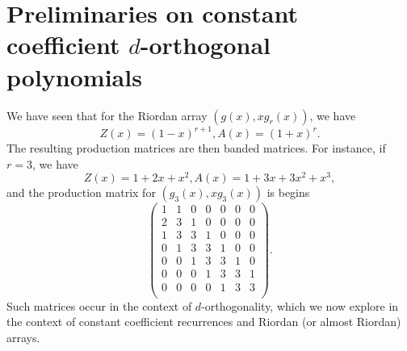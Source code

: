 \documentclass[12pt,reqno]{article}
\theoremstyle{definition}
\begin{document}
\section{Preliminaries on constant coefficient $d$-orthogonal polynomials}
We have seen that for the Riordan array $(g(x), xg_r(x))$, we have
$$Z(x)=(1-x)^{r+1}, A(x)=(1+x)^r.$$ The resulting production matrices are then banded matrices. For instance, if $r=3$, we have
$$Z(x)=1+2x+x^2, A(x)=1+3x+3x^2+x^3,$$ and the production matrix for $(g_3(x), xg_3(x))$ is begins
$$\left(
\begin{array}{ccccccc}
1 &1 & 0 & 0 & 0 & 0 & 0 \\
2 & 3 & 1 & 0 & 0 & 0 & 0 \\
1 & 3 & 3 & 1 & 0 & 0 & 0 \\
0 & 1 & 3 & 3 & 1 & 0 & 0 \\
0 & 0 & 1 & 3 & 3 & 1 & 0 \\
0 & 0 & 0 & 1 & 3 & 3 & 1 \\
0 & 0 & 0 & 0 & 1 & 3 & 3 \\
\end{array}\right).$$ Such matrices occur in the context of $d$-orthogonality, which we now explore in the context of constant coefficient recurrences and Riordan (or almost Riordan) arrays.
\end{document}
